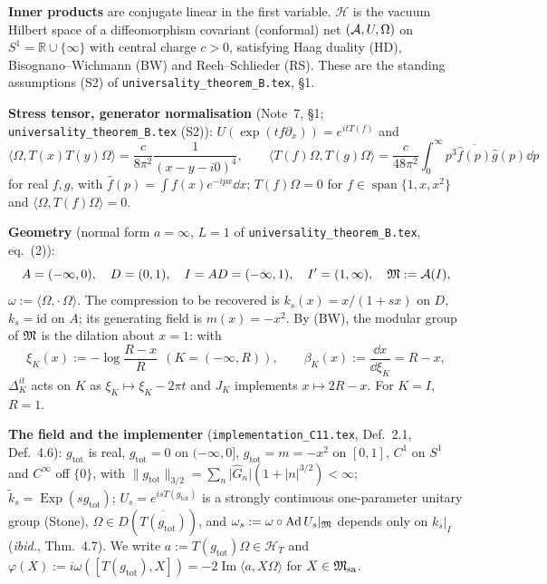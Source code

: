 \documentclass[11pt]{article}
\newcommand{\Hil}{\mathcal H}
\newcommand{\ip}[2]{\langle#1,#2\rangle}\newcommand{\norm}[1]{\lVert#1\rVert}
\newcommand{\abs}[1]{\lvert#1\rvert}
\newcommand{\gtot}{g_{\mathrm{tot}}}\newcommand{\ktil}{\tilde k}
\newcommand{\Msa}{\cM_{\mathrm{sa}}}\newcommand{\Mpsa}{\cM'_{\mathrm{sa}}}
\newcommand{\HT}{\mathcal H_T}\newcommand{\Om}{\Omega}\newcommand{\one}{\mathbf 1}
\begin{document}
\textbf{Inner products} are conjugate linear in the first variable.  $\Hil$ is the vacuum Hilbert space of a
diffeomorphism covariant (conformal) net $(\cA,U,\Om)$ on $S^1=\mathbb R\cup\{\infty\}$ with central charge
$c>0$, satisfying Haag duality (HD), Bisognano--Wichmann (BW) and Reeh--Schlieder (RS).  These are the
standing assumptions (S2) of \texttt{universality\_theorem\_B.tex}, \S1.

\textbf{Stress tensor, generator normalisation} (Note~7, \S1; \texttt{universality\_theorem\_B.tex} (S2)):
$U(\exp(tf\partial_x))=e^{itT(f)}$ and
\begin{equation}\label{eq:TT}
 \ip{\Om}{T(x)T(y)\Om}=\frac{c}{8\pi^2}\frac1{(x-y-i0)^4},\qquad
 \ip{T(f)\Om}{T(g)\Om}=\frac{c}{48\pi^2}\int_0^\infty p^3\overline{\hat f(p)}\hat g(p)\dd p
\end{equation}
for real $f,g$, with $\hat f(p)=\int f(x)e^{-ipx}\dd x$; $T(f)\Om=0$ for $f\in\operatorname{span}\{1,x,x^2\}$
and $\ip{\Om}{T(f)\Om}=0$.

\textbf{Geometry} (normal form $a=\infty$, $L=1$ of \texttt{universality\_theorem\_B.tex}, eq.~(2)):
\begin{equation}\label{eq:geom}
 A=(-\infty,0),\quad D=(0,1),\quad I=AD=(-\infty,1),\quad I'=(1,\infty),\quad \mathfrak M:=\mathcal A(I),
\end{equation}
$\omega:=\ip{\Om}{\cdot\,\Om}$.  The compression to be recovered is $k_s(x)=x/(1+sx)$ on $D$, $k_s=\mathrm{id}$
on $A$; its generating field is $m(x)=-x^2$.  By (BW), the modular group of $\mathfrak M$ is the dilation about
$x=1$: with
\begin{equation}\label{eq:frame}
 \xi_K(x):=-\log\frac{R-x}{R}\ \ (K=(-\infty,R)),\qquad \beta_K(x):=\frac{\dd x}{\dd\xi_K}=R-x,
\end{equation}
$\Delta_K^{it}$ acts on $K$ as $\xi_K\mapsto\xi_K-2\pi t$ and $J_K$ implements $x\mapsto2R-x$.  For $K=I$,
$R=1$.

\textbf{The field and the implementer} (\texttt{implementation\_C11.tex}, Def.~2.1, Def.~4.6):
$\gtot$ is real, $\gtot=0$ on $(-\infty,0]$, $\gtot=m=-x^2$ on $[0,1]$, $C^1$ on $S^1$ and $C^\infty$ off
$\{0\}$, with $\norm\gtot_{3/2}=\sum_n\abs{\hat G_n}(1+\abs n^{3/2})<\infty$; $\ktil_s=\operatorname{Exp}(s\gtot)$;
$U_s=e^{is\overline{T(\gtot)}}$ is a strongly continuous one-parameter unitary group (Stone), $\Om\in
D(\overline{T(\gtot)})$, and $\omega_s:=\omega\circ\operatorname{Ad} U_s|_{\mathfrak M}$ depends only on $k_s|_I$
(\emph{ibid.}, Thm.~4.7).  We write $a:=T(\gtot)\Om\in\HT$ and
$\varphi(X):=i\omega([T(\gtot),X])=-2\operatorname{Im}\ip a{X\Om}$ for $X\in\Msa$.
\end{document}
